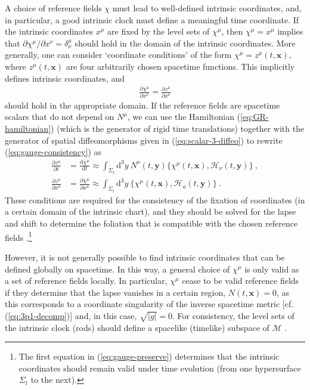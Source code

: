 \documentclass[12pt]{iopart}
\def\eq#1{\begin{equation}\begin{aligned}#1\end{aligned}\end{equation}}
\def\eref#1{(\ref{eq:#1})}
\def\D{\mathrm{d}}
\def\del#1#2{\frac{\partial#1}{\partial#2}}
\def\Del#1#2{\frac{\D#1}{\D#2}}
\def\x{\mathbf{x}}
\def\y{\mathbf{y}}
\begin{document}
A choice of reference fields $\chi$ must lead to well-defined intrinsic coordinates, and, in particular, a good intrinsic clock must define a meaningful time coordinate. If the intrinsic coordinates $x^{\mu}$ are fixed by the level sets of $\chi^{\mu}$, then $\chi^{\mu}=x^{\mu}$ implies that $\partial\chi^{\mu}/\partial x^{\nu} = \delta^{\mu}_{\nu}$ should hold in the domain of the intrinsic coordinates. More generally, one can consider `coordinate conditions' of the form $\chi^{\mu}=z^{\mu}(t,\x)$, where $z^{\mu}(t,\x)$ are four arbitrarily chosen spacetime functions. This implicitly defines intrinsic coordinates, and
\eq{\label{eq:gauge-consistency}
\del{\chi^{\mu}}{x^{\nu}} = \del{z^{\mu}}{x^{\nu}}
}
should hold in the appropriate domain. If the reference fields are spacetime scalars that do not depend on $N^{\mu}$, we can use the Hamiltonian \eref{GR-hamiltonian} (which is the generator of rigid time translations) together with the generator of spatial diffeomorphisms given in \eref{scalar-3-diffeo} to rewrite \eref{gauge-consistency} as
\eq{\label{eq:gauge-preserve}
\del{z^{\mu}}{t} &= \Del{\chi^{\mu}}{t} \approx \int_{\Sigma_t}\D^3y\ N^{\nu}(t,\y)\{\chi^{\mu}(t,\x),\mathcal{H}_{\nu}(t,\y)\} \ , \\
\del{z^{\mu}}{x^a} &= \del{\chi^{\mu}}{x^a} \approx \int_{\Sigma_t}\D^3y\ \{\chi^{\mu}(t,\x),\mathcal{H}_{a}(t,\y)\} \ .
}
These conditions are required for the consistency of the fixation of coordinates (in a certain domain of the intrinsic chart), and they should be solved for the lapse and shift to determine the foliation that is compatible with the chosen reference fields \citep{Barvinsky:1993jf}.\footnote{The first equation in \eref{gauge-preserve} determines that the intrinsic coordinates should remain valid under time evolution (from one hypersurface $\Sigma_t$ to the next).}

However, it is not generally possible to find intrinsic coordinates that can be defined globally on spacetime. In this way, a general choice of $\chi^{\mu}$ is only valid as a set of reference fields locally. In particular, $\chi^{\mu}$ cease to be valid reference fields if they determine that the lapse vanishes in a certain region, $N(t,\x)=0$, as this corresponds to a coordinate singularity of the inverse spacetime metric [cf. \eref{3p1-decomp}] and, in this case, $\sqrt{|g|} = 0$. For consistency, the level sets of the intrinsic clock (rods) should define a spacelike (timelike) subspace of $\mathcal{M}$ \citep{Isham:1992ms,Kuchar:1991qf}.
\end{document}
